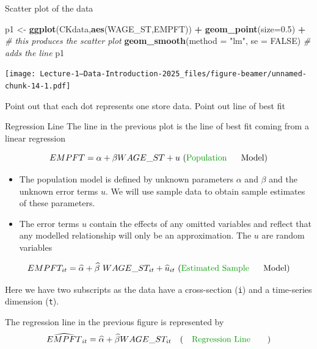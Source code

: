 \documentclass[
  ignorenonframetext,
]{beamer}
\newenvironment{Shaded}{\begin{snugshade}}{\end{snugshade}}
\newcommand{\AttributeTok}[1]{\textcolor[rgb]{0.13,0.29,0.53}{#1}}
\newcommand{\CommentTok}[1]{\textcolor[rgb]{0.56,0.35,0.01}{\textit{#1}}}
\newcommand{\ConstantTok}[1]{\textcolor[rgb]{0.56,0.35,0.01}{#1}}
\newcommand{\FloatTok}[1]{\textcolor[rgb]{0.00,0.00,0.81}{#1}}
\newcommand{\FunctionTok}[1]{\textcolor[rgb]{0.13,0.29,0.53}{\textbf{#1}}}
\newcommand{\NormalTok}[1]{#1}
\newcommand{\OtherTok}[1]{\textcolor[rgb]{0.56,0.35,0.01}{#1}}
\newcommand{\SpecialCharTok}[1]{\textcolor[rgb]{0.81,0.36,0.00}{\textbf{#1}}}
\newcommand{\StringTok}[1]{\textcolor[rgb]{0.31,0.60,0.02}{#1}}
\begin{document}
\begin{frame}[fragile]{Scatter plot of the data}
\label{scatter-plot-of-the-data}
\begin{Shaded}
\begin{Highlighting}[]
\NormalTok{p1 }\OtherTok{\textless{}{-}} \FunctionTok{ggplot}\NormalTok{(CKdata,}\FunctionTok{aes}\NormalTok{(WAGE\_ST,EMPFT)) }\SpecialCharTok{+}
  \FunctionTok{geom\_point}\NormalTok{(}\AttributeTok{size=}\FloatTok{0.5}\NormalTok{) }\SpecialCharTok{+}    \CommentTok{\# this produces the scatter plot}
  \FunctionTok{geom\_smooth}\NormalTok{(}\AttributeTok{method =} \StringTok{"lm"}\NormalTok{, }\AttributeTok{se =} \ConstantTok{FALSE}\NormalTok{)  }\CommentTok{\# adds the line }
\NormalTok{p1}
\end{Highlighting}
\end{Shaded}

\texttt{[image: Lecture-1---Data-Introduction-2025\_files/figure-beamer/unnamed-chunk-14-1.pdf]}

\footnotesize

\textcolor{student}{Point out that each dot represents one store data. Point out line of best fit}
\normalsize
\end{frame}

\begin{frame}{Regression Line}
\label{regression-line}
The line in the previous plot is the line of best fit coming from a
linear regression

\vskip -0.5cm

\[EMPFT = \alpha + \beta WAGE\_ST + u ~\text{(\textcolor{student}{Population}~~~~ Model)}\]
\vskip -0.2cm

\begin{itemize}
  \item The population model is defined by unknown parameters $\alpha$ and $\beta$ and the unknown error terms $u$. We will use sample data to obtain sample estimates of these parameters.
  \item The error terms $u$ contain the effects of any omitted variables and reflect that any modelled relationship will only be an approximation. The $u$ are \textcolor{student}{random variables}
\end{itemize}

\vskip -0.5cm

\[ EMPFT_{it} = \widehat{\alpha} + \widehat{\beta} ~ WAGE\_ST_{it} + \widehat{u}_{it} ~\text{(\textcolor{student}{Estimated Sample} ~~~~Model)}\]
\vskip -0.2cm

Here we have two subscripts as the data have a cross-section
(\texttt{\textcolor{student}{i}}) and a time-series dimension
(\texttt{\textcolor{student}{t}}).

The regression line in the previous figure is represented by
\vskip -0.5cm
\[ \widehat{EMPFT}_{it} = \widehat{\alpha} + \widehat{\beta} WAGE\_ST_{it} ~~~\text{(~~~\textcolor{student}{Regression Line}~~~~~~)}\]
\end{frame}
\end{document}
